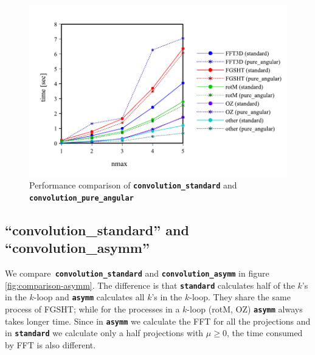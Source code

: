 \begin{figure}[H]
\begin{centering}
\includegraphics[bb=0bp 20bp 667bp 268bp,width=1\columnwidth]{_figure/results/pure_angular}
\par\end{centering}
\caption[Performance comparison of ``convolution\_standard'' and ``convolution\_pure\_angular'']{Performance comparison of \texttt{\textbf{convolution\_standard}}
and \texttt{\textbf{convolution\_pure\_angular\label{fig:comparison-pure_angular}}}}
\end{figure}


\subsection{``convolution\_standard'' and ``convolution\_asymm''}

We compare\texttt{\textbf{ convolution\_standard}} and \texttt{\textbf{convolution\_asymm}}
in figure \ref{fig:comparison-asymm}. The difference is that \texttt{\textbf{standard}}
calculates half of the $k$'s in the $k$-loop and \texttt{\textbf{asymm}}
calculates all $k$'s in the $k$-loop. They share the same process
of \acs{FGSHT}; while for the processes in a $k$-loop (rotM, OZ)
\texttt{\textbf{asymm}} always takes longer time. Since in \texttt{\textbf{asymm}}
we calculate the \acs{FFT} for all the projections and in \texttt{\textbf{standard}}
we calculate only a half projections with $\mu\geq0$, the time consumed
by \acs{FFT} is also different.

